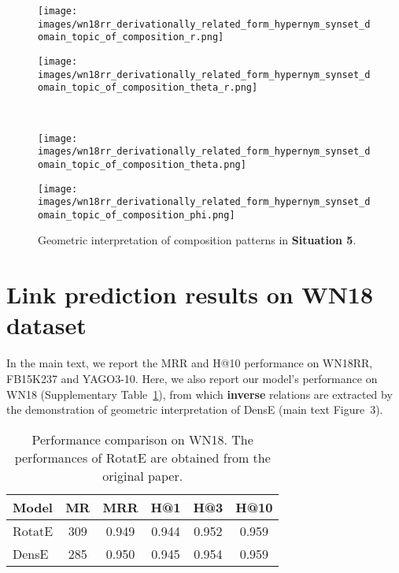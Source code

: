 \documentclass[11pt]{article}
\begin{document}
\begin{figure}[htbp]
\centering
\begin{minipage}{3.5cm}
\centering
\texttt{[image: images/wn18rr\_derivationally\_related\_form\_hypernym\_synset\_domain\_topic\_of\_composition\_r.png]}
\subcaption{\tiny{}}
\end{minipage}
\begin{minipage}{3.5cm}
\centering
\texttt{[image: images/wn18rr\_derivationally\_related\_form\_hypernym\_synset\_domain\_topic\_of\_composition\_theta\_r.png]}
\subcaption{\tiny{}}
\end{minipage}
\\
\begin{minipage}{3.5cm}
\centering
\texttt{[image: images/wn18rr\_derivationally\_related\_form\_hypernym\_synset\_domain\_topic\_of\_composition\_theta.png]}
\subcaption{\tiny{}}
\end{minipage}
\begin{minipage}{3.5cm}
\centering
\texttt{[image: images/wn18rr\_derivationally\_related\_form\_hypernym\_synset\_domain\_topic\_of\_composition\_phi.png]}
\subcaption{\tiny{}}
\end{minipage}
\caption{Geometric interpretation of composition patterns in \textbf{Situation 5}.}
\label{105}
\end{figure}


\section{Link prediction results on WN18 dataset}

In the main text, we report the MRR and H@10 performance on WN18RR, FB15K237 and YAGO3-10. Here, we also report our model's performance on WN18 (Supplementary Table~\ref{WN18}), from which \textbf{inverse} relations are extracted by the demonstration of geometric interpretation of DensE (main text Figure~3).

\begin{table}[]
\centering
\caption{Performance comparison on WN18. The performances of RotatE are obtained from the original paper.}
 \begin{tabular}{ l c c c c c }
  \toprule
  
Model & MR & MRR	&H@1	&H@3&	H@10\\
  \midrule
RotatE	&	309	&	0.949	&	0.944	&	0.952	&	0.959		\\
DensE	&	285	&	0.950	&	0.945	&	0.954	&	0.959	\\
  \bottomrule
\bottomrule
  \end{tabular} 
\label{WN18}

\end{table}
\end{document}
